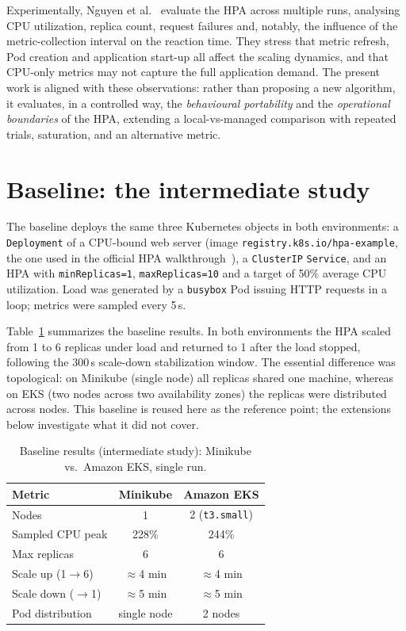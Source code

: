 \documentclass[conference]{IEEEtran}
\begin{document}
Experimentally, Nguyen et al.~\cite{nguyen2020} evaluate the HPA across multiple
runs, analysing CPU utilization, replica count, request failures and, notably,
the influence of the metric-collection interval on the reaction time. They stress
that metric refresh, Pod creation and application start-up all affect the scaling
dynamics, and that CPU-only metrics may not capture the full application demand.
The present work is aligned with these observations: rather than proposing a new
algorithm, it evaluates, in a controlled way, the \emph{behavioural portability}
and the \emph{operational boundaries} of the HPA, extending a local-vs-managed
comparison with repeated trials, saturation, and an alternative metric.

\section{Baseline: the intermediate study}
\label{sec:baseline}
The baseline deploys the same three Kubernetes objects in both environments: a
\texttt{Deployment} of a CPU-bound web server (image
\texttt{registry.k8s.io/hpa-example}, the one used in the official HPA
walkthrough~\cite{k8s-hpa}), a \texttt{ClusterIP} \texttt{Service}, and an HPA
with \texttt{minReplicas=1}, \texttt{maxReplicas=10} and a target of 50\% average
CPU utilization. Load was generated by a \texttt{busybox} Pod issuing HTTP
requests in a loop; metrics were sampled every 5\,s.

Table~\ref{tab:baseline} summarizes the baseline results. In both environments
the HPA scaled from 1 to 6 replicas under load and returned to 1 after the load
stopped, following the 300\,s scale-down stabilization window. The essential
difference was topological: on Minikube (single node) all replicas shared one
machine, whereas on EKS (two nodes across two availability zones) the replicas
were distributed across nodes. This baseline is reused here as the reference
point; the extensions below investigate what it did not cover.

\begin{table}[!t]
\caption{Baseline results (intermediate study): Minikube vs.\ Amazon EKS,
single run.}
\label{tab:baseline}
\centering
\begin{tabular}{@{}lcc@{}}
\toprule
\textbf{Metric} & \textbf{Minikube} & \textbf{Amazon EKS} \\
\midrule
Nodes                    & 1        & 2 (\texttt{t3.small}) \\
Sampled CPU peak         & 228\%    & 244\%    \\
Max replicas             & 6        & 6        \\
Scale up (1$\to$6)       & $\approx$4 min & $\approx$4 min \\
Scale down ($\to$1)      & $\approx$5 min & $\approx$5 min \\
Pod distribution         & single node & 2 nodes \\
\bottomrule
\end{tabular}
\end{table}
\end{document}
